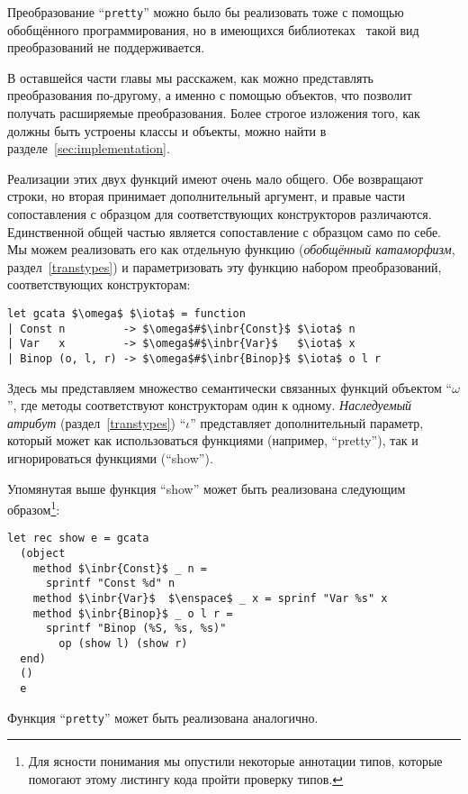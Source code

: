 Преобразование ``\lstinline{pretty}'' можно было бы реализовать тоже с помощью обобщённого программирования, но в имеющихся библиотеках~\cite{PPXLib,ppxderiving} \OCaml{} такой вид преобразований не поддерживается.

В оставшейся части главы мы расскажем, как можно представлять преобразования по-другому, а именно с помощью объектов, что позволит получать расширяемые преобразования. Более строгое изложения того, как должны быть устроены классы и объекты, можно найти в разделе~\ref{sec:implementation}.

Реализации этих двух функций имеют очень мало общего. Обе возвращают строки, но вторая принимает дополнительный аргумент, и 
правые части сопоставления с образцом для соответствующих конструкторов различаются. Единственной общей частью является
сопоставление с образцом само по себе. Мы можем реализовать его как отдельную функцию (\emph{обобщённый катаморфизм}, раздел~\ref{transtypes}) и параметризовать эту функцию набором  преобразований, 
соответствующих конструкторам:

\begin{lstlisting}
let gcata $\omega$ $\iota$ = function
| Const n         -> $\omega$#$\inbr{Const}$ $\iota$ n
| Var   x         -> $\omega$#$\inbr{Var}$   $\iota$ x
| Binop (o, l, r) -> $\omega$#$\inbr{Binop}$ $\iota$ o l r
\end{lstlisting}

Здесь мы представляем множество семантически связанных функций объектом ``$\omega$'', где методы соответствуют конструкторам
один к одному. \emph{Наследуемый атрибут} (раздел~\ref{transtypes}) ``$\iota$'' представляет дополнительный параметр, который может как использоваться функциями (например, ``pretty''), так и игнорироваться функциями (``show'').

Упомянутая выше функция ``show'' может быть реализована следующим образом\footnote{Для ясности понимания мы опустили некоторые аннотации типов, которые помогают этому листингу кода пройти проверку типов.}:

\begin{lstlisting}
let rec show e = gcata
  (object
    method $\inbr{Const}$ _ n = 
      sprintf "Const %d" n
    method $\inbr{Var}$  $\enspace$ _ x = sprinf "Var %s" x
    method $\inbr{Binop}$ _ o l r =
      sprintf "Binop (%S, %s, %s)" 
        op (show l) (show r)
  end)
  ()
  e
\end{lstlisting}

\noindent Функция ``\lstinline{pretty}'' может быть реализована аналогично.

